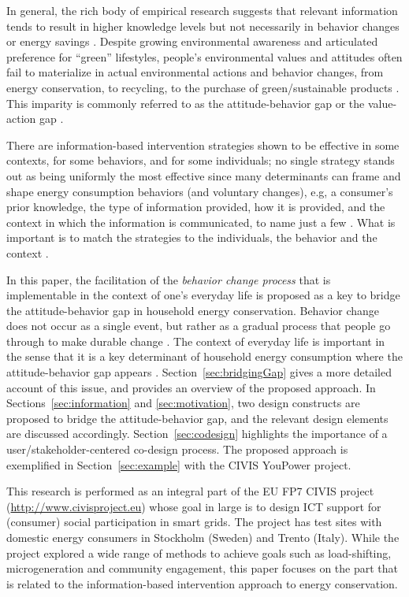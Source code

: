 \documentclass[a4paper]{article}
\begin{document}
In general, the rich body of empirical research suggests that relevant information tends to result in higher knowledge levels but not necessarily in behavior changes or energy savings \citep{Abrahamse2005,+}. Despite growing environmental awareness and articulated preference for ``green'' lifestyles, people's environmental values and attitudes often fail to materialize in actual environmental actions and behavior changes, from energy conservation, to recycling,  to the purchase of green/sustainable products \citep{Schultz2002,Abrahamse2005,Claudy2013}. This imparity is commonly referred to as the attitude-behavior gap or the value-action gap \citep{Blake1999,Kollmuss2002,Claudy2013}. 

There are information-based intervention strategies shown to be effective in some contexts, for some behaviors, and for some individuals; no single strategy stands out as being uniformly the most effective \citep{Schultz2014} since many determinants can frame and shape energy consumption behaviors (and voluntary changes), e.g, a consumer's prior knowledge, the type of information provided, how it is provided, and the context in which the information is communicated, to name just a few \citep{Delmas2013,+}. What is important is to match the strategies to the individuals, the behavior and the context \citep{Schultz2014}. 

In this paper, the facilitation of the \textit{behavior change process} that is implementable in the context of one's everyday life is proposed as a key to bridge the attitude-behavior gap in household energy conservation. Behavior change does not occur as a single event, but rather as a gradual process that people go through to make durable change \citep{Niedderer2014}. The context of everyday life is important in the sense that it is a key determinant of household energy consumption where the attitude-behavior gap appears \citep{Burchell2014,Selvefors2015}. Section~\ref{sec:bridgingGap} gives a more detailed account of this issue, and provides an overview of the proposed approach. In Sections~\ref{sec:information} and \ref{sec:motivation}, two design constructs are proposed to bridge the attitude-behavior gap, and the relevant design elements are discussed accordingly. Section~\ref{sec:codesign} highlights the importance of a user/stakeholder-centered co-design process. The proposed approach is exemplified in Section~\ref{sec:example} with the CIVIS YouPower project.

This research is performed as an integral part of the EU FP7 CIVIS project (\url{http://www.civisproject.eu}) whose goal in large is to design ICT support for (consumer) social participation in smart grids. The project has test sites with domestic energy consumers in Stockholm (Sweden) and Trento (Italy). While the project explored a wide range of methods to achieve goals such as load-shifting, microgeneration and community engagement, this paper focuses on the part that is related to the information-based intervention approach to energy conservation.
\end{document}
